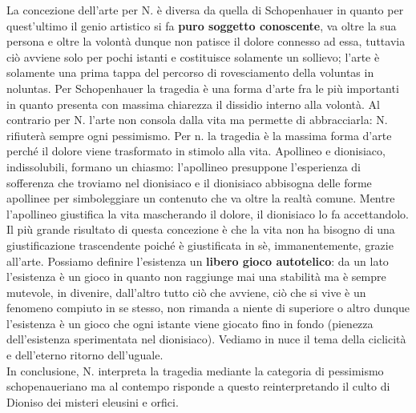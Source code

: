 \documentclass[10pt,a4paper]{article}
\begin{document}
La concezione dell'arte per N. è diversa da quella di Schopenhauer in quanto per quest'ultimo il genio artistico si fa \textbf{puro soggetto conoscente}, va oltre la sua persona e oltre la volontà dunque non patisce il dolore connesso ad essa, tuttavia ciò avviene solo per pochi istanti e costituisce solamente un sollievo; l'arte è solamente una prima tappa del percorso di rovesciamento della voluntas in noluntas. Per Schopenhauer la tragedia è una forma d'arte fra le più importanti in quanto presenta con massima chiarezza il dissidio interno alla volontà. Al contrario per N. l'arte non consola dalla vita ma permette di abbracciarla: N. rifiuterà sempre ogni pessimismo. Per n. la tragedia è la massima forma d'arte perché il dolore viene trasformato in stimolo alla vita. Apollineo e dionisiaco, indissolubili, formano un chiasmo: l'apollineo presuppone l'esperienza di sofferenza che troviamo nel dionisiaco e il dionisiaco abbisogna delle forme apollinee per simboleggiare un contenuto che va oltre la realtà comune. Mentre l'apollineo giustifica la vita mascherando il dolore, il dionisiaco lo fa accettandolo. Il più grande risultato di questa concezione è che la vita non ha bisogno di una giustificazione trascendente poiché è giustificata in sè, immanentemente, grazie all'arte. Possiamo definire l'esistenza un \textbf{libero gioco autotelico}: da un lato l'esistenza è un gioco in quanto non raggiunge mai una stabilità ma è sempre mutevole, in divenire,  dall'altro tutto ciò che avviene, ciò che si vive è un fenomeno compiuto in se stesso, non rimanda a niente di superiore o altro dunque l'esistenza è un gioco che ogni istante viene giocato fino in fondo (pienezza dell'esistenza sperimentata nel dionisiaco). Vediamo in nuce il tema della ciclicità e dell'eterno ritorno dell'uguale. \\
In conclusione, N. interpreta la tragedia mediante la categoria di pessimismo schopenaueriano ma al contempo risponde a questo reinterpretando il culto di Dioniso dei misteri eleusini e orfici. 
\end{document}
